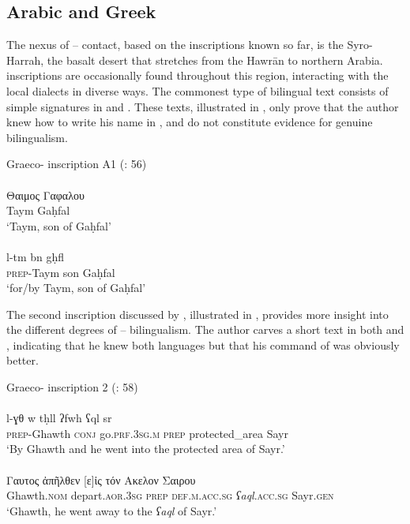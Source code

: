 \documentclass[output=paper]{langsci/langscibook}
\begin{document}
\subsection{Arabic and Greek}
The nexus of -- contact, based on the inscriptions known so far, is the Syro- Harrah, the basalt desert that stretches from the Hawrān to northern Arabia.  inscriptions are occasionally found throughout this region, interacting with the local  dialects in diverse ways. The commonest type of bilingual text consists of simple signatures in  and . These texts, illustrated in , only prove that the author knew how to write his name in , and do not constitute evidence for genuine {bilingualism}. 

\ea Graeco- inscription A1 (\citealt{Al-Jalladal-Manaser2016}: 56)\label{Taym}\\
 \\ 
\gll    Θαιμος Γαφαλου \\
        Taym Gaḥfal\\
\glt `Taym, son of Gaḥfal'\\

 \\
\gll   l-tm bn gḥfl \\
       \textsc{prep}-Taym son Gaḥfal \\
\glt `for/by Taym, son of Gaḥfal'\\
\z
\z

 The second inscription discussed by \citet{Al-Jalladal-Manaser2016}, illustrated in , provides more insight into the different degrees of -- {bilingualism}. The author carves a short text in both  and  , indicating that he knew both languages but that his command of  was obviously better.

\ea Graeco- inscription 2 (\citealt{Al-Jalladal-Manaser2016}: 58)\label{Ghawth}\\
 \\
\gll   l-ɣθ w tḥll ʔfwh ʕql sr \\
       \textsc{prep}-Ghawth \textsc{conj} go.\textsc{prf.3sg.m} \textsc{prep} protected\_area Sayr\\
\glt `By Ghawth and he went into the protected area of Sayr.'\\
 \\ 
\gll    Γαυτος ἀπῆλθεν [ε]ἰς τόν Ακελον Σαιρου\\
Ghawth.\textsc{nom} depart.\textsc{aor.3sg} \textsc{prep} \textsc{def.m.acc.sg} \textit{ʕaql}.\textsc{acc.sg} Sayr.\textsc{gen}\\ 
\glt `Ghawth, he went away to the \textit{ʕaql} of Sayr.'\\
\z
\z
\end{document}
